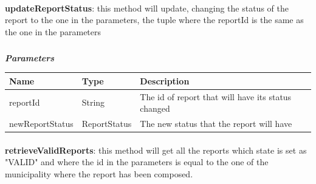 					\paragraph{}
							\textbf{updateReportStatus}: this method will update, changing the status of the report to the one in the parameters, the tuple where the reportId is the same as the one in the parameters
							\subparagraph{}
							\textit{\textbf{Parameters}}
							\vspace{-2mm}
								\begin{table}[!h]
									\begin{tabular}{L{0.22\textwidth}L{0.22\textwidth}L{0.4\textwidth}}
										\toprule
										\textbf{Name} & \textbf{Type} & \textbf{Description} \\
										\midrule
								  		reportId & String & The id of report that will have its status changed \\
								  		newReportStatus & ReportStatus & The new status that the report will have \\
								 		\bottomrule
									\end{tabular}
								\end{table}
						
					\paragraph{}
							\textbf{retrieveValidReports}: this method will get all the reports which state is set as "VALID" and where the id in the parameters is equal to the one of the municipality where the report has been composed.
							

